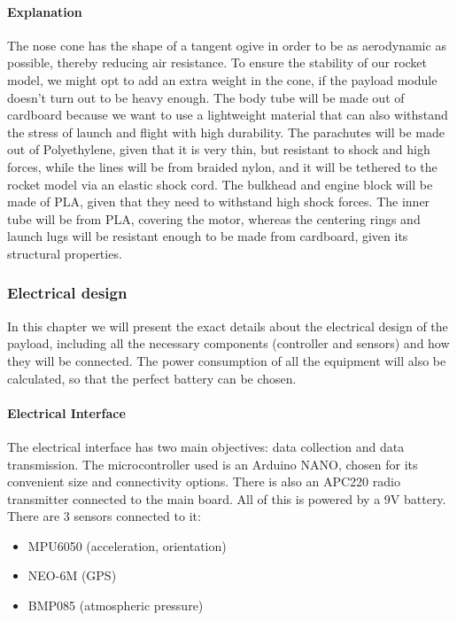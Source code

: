 \paragraph{Explanation}

The nose cone has the shape of a tangent ogive in order to be as aerodynamic as possible, thereby reducing air resistance. To ensure the stability of our rocket model, we might opt to add an extra weight in the cone, if the payload module doesn’t turn out to be heavy enough. The body tube will be made out of cardboard because we want to use a lightweight material that can also withstand the stress of launch and flight with high durability. The parachutes will be made out of Polyethylene, given that it is very thin, but resistant to shock and high forces, while the lines will be from braided nylon, and it will be tethered to the rocket model via an elastic shock cord. The bulkhead and engine block will be made of PLA, given that they need to withstand high shock forces. The inner tube will be from PLA, covering the motor, whereas the centering rings and launch lugs will be resistant enough to be made from cardboard, given its structural properties.

\subsubsection{Electrical design}

In this chapter we will present the exact details about the electrical design of the payload, including all the necessary components (controller and sensors) and how they will be connected. The power consumption of all the equipment will also be calculated, so that the perfect battery can be chosen.

\paragraph{Electrical Interface}

The electrical interface has two main objectives: data collection and data transmission. The microcontroller used is an Arduino NANO, chosen for its convenient size and connectivity options. There is also an APC220 radio transmitter connected to the main board. All of this is powered by a 9V battery. There are 3 sensors connected to it:

\begin{itemize}
 \item MPU6050 (acceleration, orientation)
 \item NEO-6M (GPS)
 \item BMP085 (atmospheric pressure)
\end{itemize}

